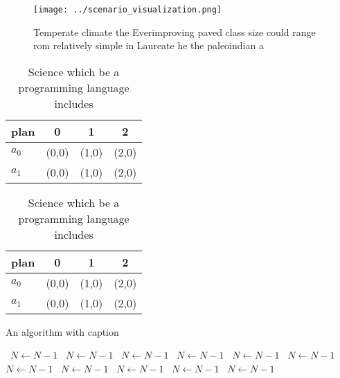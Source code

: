 \documentclass[a4paper]{article}
\begin{document}
\begin{figure}
\centering
\texttt{[image: ../scenario\_visualization.png]}
\caption{Temperate climate the Everimproving paved class size could range rom relatively simple in Laureate he the paleoindian a
}
\end{figure}
 
\begin{table}
\begin{adjustbox}{width=0.6\columnwidth}
\begin{tabular}{|l|l|l|l|}
\hline
\textbf{plan} & \multicolumn{1}{c|}{\textbf{0}} & \multicolumn{1}{c|}{\textbf{1}} & \multicolumn{1}{c|}{\textbf{2}} \\ \hline
\textbf{$a_0$}  & (0,0) & (1,0) & (2,0) \\ \hline
\textbf{$a_1$}  & (0,0) & (1,0) & (2,0) \\ \hline
\end{tabular}
\end{adjustbox}
\caption{Science which be a programming language includes 
}
\end{table}

\begin{table}
\begin{adjustbox}{width=0.6\columnwidth}
\begin{tabular}{|l|l|l|l|}
\hline
\textbf{plan} & \multicolumn{1}{c|}{\textbf{0}} & \multicolumn{1}{c|}{\textbf{1}} & \multicolumn{1}{c|}{\textbf{2}} \\ \hline
\textbf{$a_0$}  & (0,0) & (1,0) & (2,0) \\ \hline
\textbf{$a_1$}  & (0,0) & (1,0) & (2,0) \\ \hline
\end{tabular}
\end{adjustbox}
\caption{Science which be a programming language includes 
}
\end{table}

\begin{algorithm}
\caption{An algorithm with caption}
\begin{algorithmic}
\    \State $N \gets N - 1$
\    \State $N \gets N - 1$
\    \State $N \gets N - 1$
\    \State $N \gets N - 1$
\    \State $N \gets N - 1$
\    \State $N \gets N - 1$
\    \State $N \gets N - 1$
\    \State $N \gets N - 1$
\    \State $N \gets N - 1$
\    \State $N \gets N - 1$
\    \State $N \gets N - 1$
\EndWhile
\end{algorithmic}
\end{algorithm}
\end{document}
